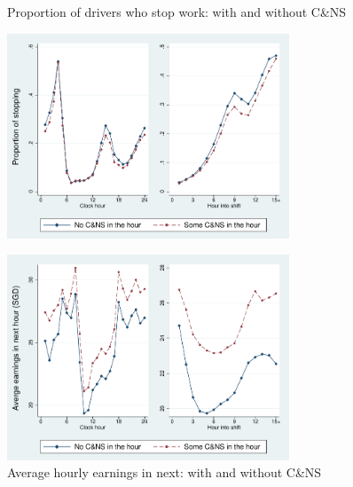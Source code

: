 \documentclass[reviewmode]{restat}
\begin{document}
\FloatBarrier


\begin{figure}
	{\centering
		\caption{Proportion of drivers who stop work: with and without C\&NS} %
		\includegraphics[width=0.75\textwidth]{./fg/modelfree_quit_vert.pdf}
		\label{fg:quitbyhour}
	}

	{\centering
		\caption{Average hourly earnings in next: with and without C\&NS} %
		\includegraphics[width=0.75\textwidth]{./fg/modelfree_earnings_vert.pdf}

}
\end{figure}
\end{document}
